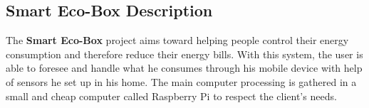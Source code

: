 
\subsection{Smart Eco-Box Description}
%
%


The \textbf{Smart Eco-Box} project aims toward helping people control their energy consumption and therefore reduce their energy bills. With this system, the user is able to foresee and handle what he consumes through his mobile device with help of sensors he set up in his home. The main computer processing is gathered in a small and cheap computer called Raspberry Pi to respect the client's needs.


